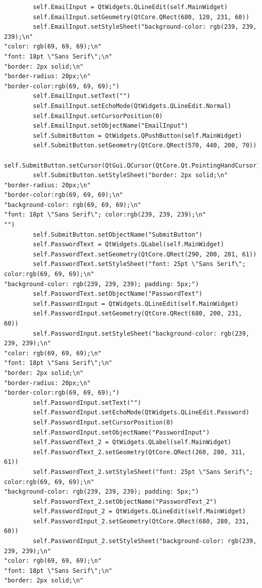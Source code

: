 \documentclass[12pt]{article}
\begin{document}
\begin{lstlisting}
        self.EmailInput = QtWidgets.QLineEdit(self.MainWidget)
        self.EmailInput.setGeometry(QtCore.QRect(680, 120, 231, 60))
        self.EmailInput.setStyleSheet("background-color: rgb(239, 239, 239);\n"
"color: rgb(69, 69, 69);\n"
"font: 18pt \"Sans Serif\";\n"
"border: 2px solid;\n"
"border-radius: 20px;\n"
"border-color:rgb(69, 69, 69);")
        self.EmailInput.setText("")
        self.EmailInput.setEchoMode(QtWidgets.QLineEdit.Normal)
        self.EmailInput.setCursorPosition(0)
        self.EmailInput.setObjectName("EmailInput")
        self.SubmitButton = QtWidgets.QPushButton(self.MainWidget)
        self.SubmitButton.setGeometry(QtCore.QRect(570, 440, 200, 70))
        self.SubmitButton.setCursor(QtGui.QCursor(QtCore.Qt.PointingHandCursor))
        self.SubmitButton.setStyleSheet("border: 2px solid;\n"
"border-radius: 20px;\n"
"border-color:rgb(69, 69, 69);\n"
"background-color: rgb(69, 69, 69);\n"
"font: 18pt \"Sans Serif\"; color:rgb(239, 239, 239);\n"
"")
        self.SubmitButton.setObjectName("SubmitButton")
        self.PasswordText = QtWidgets.QLabel(self.MainWidget)
        self.PasswordText.setGeometry(QtCore.QRect(290, 200, 281, 61))
        self.PasswordText.setStyleSheet("font: 25pt \"Sans Serif\"; color:rgb(69, 69, 69);\n"
"background-color: rgb(239, 239, 239); padding: 5px;")
        self.PasswordText.setObjectName("PasswordText")
        self.PasswordInput = QtWidgets.QLineEdit(self.MainWidget)
        self.PasswordInput.setGeometry(QtCore.QRect(680, 200, 231, 60))
        self.PasswordInput.setStyleSheet("background-color: rgb(239, 239, 239);\n"
"color: rgb(69, 69, 69);\n"
"font: 18pt \"Sans Serif\";\n"
"border: 2px solid;\n"
"border-radius: 20px;\n"
"border-color:rgb(69, 69, 69);")
        self.PasswordInput.setText("")
        self.PasswordInput.setEchoMode(QtWidgets.QLineEdit.Password)
        self.PasswordInput.setCursorPosition(0)
        self.PasswordInput.setObjectName("PasswordInput")
        self.PasswordText_2 = QtWidgets.QLabel(self.MainWidget)
        self.PasswordText_2.setGeometry(QtCore.QRect(260, 280, 311, 61))
        self.PasswordText_2.setStyleSheet("font: 25pt \"Sans Serif\"; color:rgb(69, 69, 69);\n"
"background-color: rgb(239, 239, 239); padding: 5px;")
        self.PasswordText_2.setObjectName("PasswordText_2")
        self.PasswordInput_2 = QtWidgets.QLineEdit(self.MainWidget)
        self.PasswordInput_2.setGeometry(QtCore.QRect(680, 280, 231, 60))
        self.PasswordInput_2.setStyleSheet("background-color: rgb(239, 239, 239);\n"
"color: rgb(69, 69, 69);\n"
"font: 18pt \"Sans Serif\";\n"
"border: 2px solid;\n"

\end{lstlisting}
\end{document}
